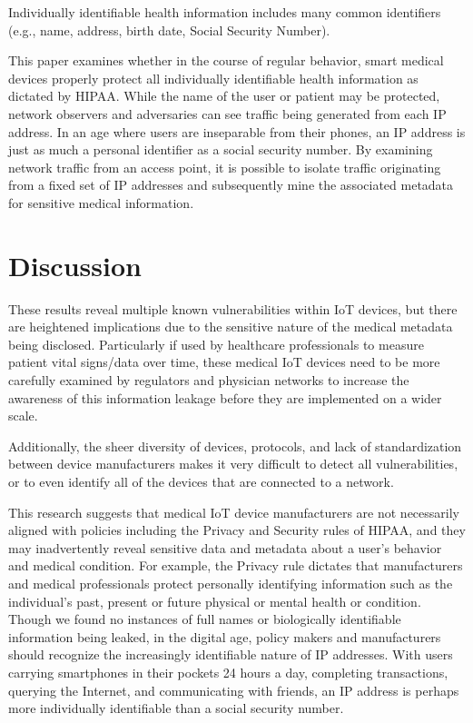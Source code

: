 Individually identifiable health information includes many common identifiers (e.g., name, address, birth date, Social Security Number).

This paper examines whether in the course of regular behavior, smart medical devices properly protect all individually identifiable health information as dictated by HIPAA. While the name of the user or patient may be protected, network observers and adversaries can see traffic being generated from each IP address. In an age where users are inseparable from their phones, an IP address is just as much a personal identifier as a social security number. By examining network traffic from an access point, it is possible to isolate traffic originating from a fixed set of IP addresses and subsequently mine the associated metadata for sensitive medical information. 



\section{Discussion}

These results reveal multiple known vulnerabilities within IoT devices, but there are heightened implications due to the sensitive nature of the medical metadata being disclosed. Particularly if used by healthcare professionals to measure patient vital signs/data over time, these medical IoT devices need to be more carefully examined by regulators and physician networks to increase the awareness of this information leakage before they are implemented on a wider scale. 

Additionally, the sheer diversity of devices, protocols, and lack of standardization between device manufacturers makes it very difficult to detect all vulnerabilities, or to even identify all of the devices that are connected to a network.

This research suggests that medical IoT device manufacturers are not necessarily aligned with policies including the Privacy and Security rules of HIPAA, and they may inadvertently reveal sensitive data and metadata about a user's behavior and medical condition. For example, the Privacy rule dictates that manufacturers and medical professionals protect personally identifying information such as the individual's past, present or future physical or mental health or condition. Though we found no instances of full names or biologically identifiable information being leaked, in the digital age, policy makers and manufacturers should recognize the increasingly identifiable nature of IP addresses. With users carrying smartphones in their pockets 24 hours a day, completing transactions, querying the Internet, and communicating with friends, an IP address is perhaps more individually identifiable than a social security number.

